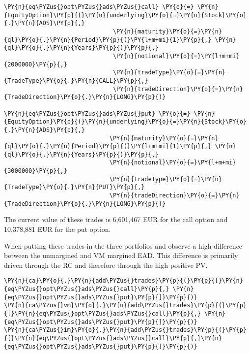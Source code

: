     \begin{tcolorbox}[breakable, size=fbox, boxrule=1pt, pad at break*=1mm,colback=cellbackground, colframe=cellborder]
\begin{Verbatim}[commandchars=\\\{\}]
\PY{n}{eq\PYZus{}opt\PYZus{}ads\PYZus{}call} \PY{o}{=} \PY{n}{EquityOption}\PY{p}{(}\PY{n}{underlying}\PY{o}{=}\PY{n}{Stock}\PY{o}{.}\PY{n}{ADS}\PY{p}{,}
                               \PY{n}{maturity}\PY{o}{=}\PY{n}{ql}\PY{o}{.}\PY{n}{Period}\PY{p}{(}\PY{l+m+mi}{1}\PY{p}{,} \PY{n}{ql}\PY{o}{.}\PY{n}{Years}\PY{p}{)}\PY{p}{,}
                               \PY{n}{notional}\PY{o}{=}\PY{l+m+mi}{2000000}\PY{p}{,}
                               \PY{n}{tradeType}\PY{o}{=}\PY{n}{TradeType}\PY{o}{.}\PY{n}{CALL}\PY{p}{,}
                               \PY{n}{tradeDirection}\PY{o}{=}\PY{n}{TradeDirection}\PY{o}{.}\PY{n}{LONG}\PY{p}{)}

\PY{n}{eq\PYZus{}opt\PYZus{}ads\PYZus{}put} \PY{o}{=} \PY{n}{EquityOption}\PY{p}{(}\PY{n}{underlying}\PY{o}{=}\PY{n}{Stock}\PY{o}{.}\PY{n}{ADS}\PY{p}{,}
                              \PY{n}{maturity}\PY{o}{=}\PY{n}{ql}\PY{o}{.}\PY{n}{Period}\PY{p}{(}\PY{l+m+mi}{1}\PY{p}{,} \PY{n}{ql}\PY{o}{.}\PY{n}{Years}\PY{p}{)}\PY{p}{,}
                              \PY{n}{notional}\PY{o}{=}\PY{l+m+mi}{3000000}\PY{p}{,}
                              \PY{n}{tradeType}\PY{o}{=}\PY{n}{TradeType}\PY{o}{.}\PY{n}{PUT}\PY{p}{,}
                              \PY{n}{tradeDirection}\PY{o}{=}\PY{n}{TradeDirection}\PY{o}{.}\PY{n}{LONG}\PY{p}{)}
\end{Verbatim}
\end{tcolorbox}

    The current value of these trades is 6,601,467 EUR for the call option
and 10,378,881 EUR for the put option.

    
    When putting these trades in the three portfolios and observe a high
difference between the unmargined and VM margined EAD. This difference
is primarily driven through the RC and therefore through the high
positive PV.

    \begin{tcolorbox}[breakable, size=fbox, boxrule=1pt, pad at break*=1mm,colback=cellbackground, colframe=cellborder]
\begin{Verbatim}[commandchars=\\\{\}]
\PY{n}{ca}\PY{o}{.}\PY{n}{add\PYZus{}trades}\PY{p}{(}\PY{p}{[}\PY{n}{eq\PYZus{}opt\PYZus{}ads\PYZus{}call}\PY{p}{,} \PY{n}{eq\PYZus{}opt\PYZus{}ads\PYZus{}put}\PY{p}{]}\PY{p}{)}
\PY{n}{ca\PYZus{}vm}\PY{o}{.}\PY{n}{add\PYZus{}trades}\PY{p}{(}\PY{p}{[}\PY{n}{eq\PYZus{}opt\PYZus{}ads\PYZus{}call}\PY{p}{,} \PY{n}{eq\PYZus{}opt\PYZus{}ads\PYZus{}put}\PY{p}{]}\PY{p}{)}
\PY{n}{ca\PYZus{}im}\PY{o}{.}\PY{n}{add\PYZus{}trades}\PY{p}{(}\PY{p}{[}\PY{n}{eq\PYZus{}opt\PYZus{}ads\PYZus{}call}\PY{p}{,}\PY{n}{eq\PYZus{}opt\PYZus{}ads\PYZus{}put}\PY{p}{]}\PY{p}{)}
\end{Verbatim}
\end{tcolorbox}

